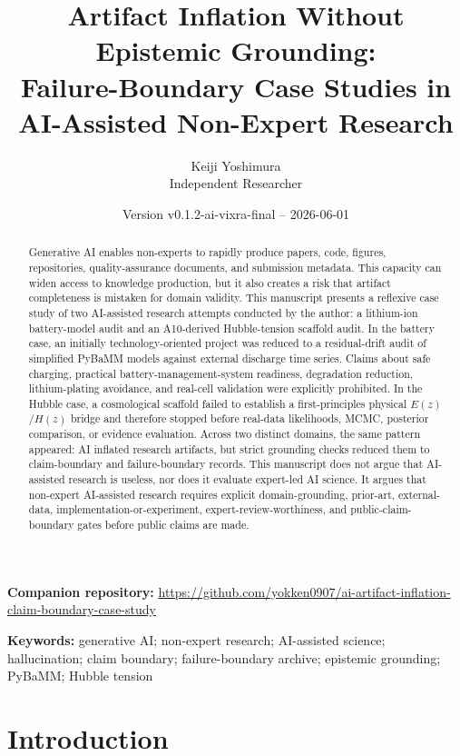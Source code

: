 \documentclass[a4paper,11pt]{article}
\title{Artifact Inflation Without Epistemic Grounding:\\
\large Failure-Boundary Case Studies in AI-Assisted Non-Expert Research}
\author{Keiji Yoshimura\\
\small Independent Researcher}
\date{Version v0.1.2-ai-vixra-final -- 2026-06-01}
\begin{document}
\maketitle

\noindent\textbf{Companion repository:} \url{https://github.com/yokken0907/ai-artifact-inflation-claim-boundary-case-study}

\begin{abstract}
Generative AI enables non-experts to rapidly produce papers, code, figures, repositories, quality-assurance documents, and submission metadata. This capacity can widen access to knowledge production, but it also creates a risk that artifact completeness is mistaken for domain validity. This manuscript presents a reflexive case study of two AI-assisted research attempts conducted by the author: a lithium-ion battery-model audit and an A10-derived Hubble-tension scaffold audit. In the battery case, an initially technology-oriented project was reduced to a residual-drift audit of simplified PyBaMM models against external discharge time series. Claims about safe charging, practical battery-management-system readiness, degradation reduction, lithium-plating avoidance, and real-cell validation were explicitly prohibited. In the Hubble case, a cosmological scaffold failed to establish a first-principles physical $E(z)$/$H(z)$ bridge and therefore stopped before real-data likelihoods, MCMC, posterior comparison, or evidence evaluation. Across two distinct domains, the same pattern appeared: AI inflated research artifacts, but strict grounding checks reduced them to claim-boundary and failure-boundary records. This manuscript does not argue that AI-assisted research is useless, nor does it evaluate expert-led AI science. It argues that non-expert AI-assisted research requires explicit domain-grounding, prior-art, external-data, implementation-or-experiment, expert-review-worthiness, and public-claim-boundary gates before public claims are made.
\end{abstract}

\noindent\textbf{Keywords:} generative AI; non-expert research; AI-assisted science; hallucination; claim boundary; failure-boundary archive; epistemic grounding; PyBaMM; Hubble tension

\section{Introduction}
\end{document}
